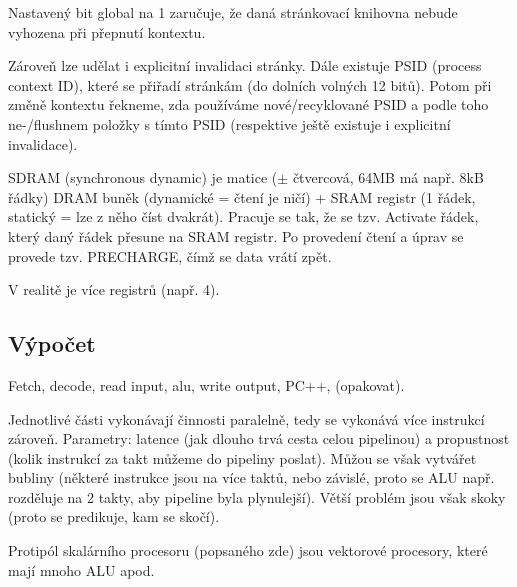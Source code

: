 \documentclass[12pt]{article}                   %
\begin{document}
        \begin{definice}
            Nastavený bit global na 1 zaručuje, že daná stránkovací knihovna nebude vyhozena při přepnutí kontextu.

            Zároveň lze udělat i explicitní invalidaci stránky. Dále existuje PSID (process context ID), které se přiřadí stránkám (do dolních volných 12 bitů). Potom při změně kontextu řekneme, zda používáme nové/recyklované PSID a podle toho ne-/flushnem položky s tímto PSID (respektive ještě existuje i explicitní invalidace).
        \end{definice}

        \begin{definice}
            SDRAM (synchronous dynamic) je matice ($±$ čtvercová, 64MB má např. 8kB řádky) DRAM buněk (dynamické = čtení je ničí) + SRAM registr (1 řádek, statický = lze z něho číst dvakrát). Pracuje se tak, že se tzv. Activate řádek, který daný řádek přesune na SRAM registr. Po provedení čtení a úprav se provede tzv. PRECHARGE, čímž se data vrátí zpět.

            V realitě je více registrů (např. 4).
        \end{definice}

    \subsection{Výpočet}
        \begin{poznamka}[Historicky]
            Fetch, decode, read input, alu, write output, PC++, (opakovat).
        \end{poznamka}

        \begin{definice}
            Jednotlivé části vykonávají činnosti paralelně, tedy se vykonává více instrukcí zároveň. Parametry: latence (jak dlouho trvá cesta celou pipelinou) a propustnost (kolik instrukcí za takt můžeme do pipeliny poslat). Můžou se však vytvářet bubliny (některé instrukce jsou na více taktů, nebo závislé, proto se ALU např. rozděluje na 2 takty, aby pipeline byla plynulejší). Větší problém jsou však skoky (proto se predikuje, kam se skočí).

            Protipól skalárního procesoru (popsaného zde) jsou vektorové procesory, které mají mnoho ALU apod.
        \end{definice}
\end{document}
